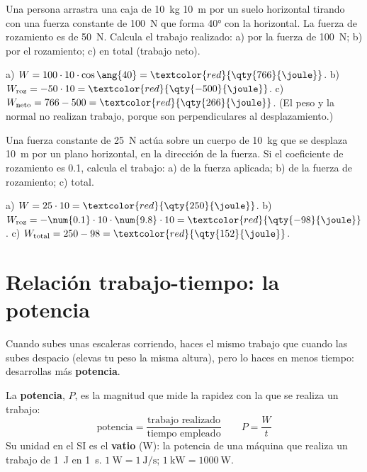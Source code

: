 \begin{exercise}
    Una persona arrastra una caja de \qty{10}{\kg} \qty{10}{\m} por un suelo horizontal tirando con una fuerza constante de \qty{100}{\newton} que forma \ang{40} con la horizontal. La fuerza de rozamiento es de \qty{50}{\newton}. Calcula el trabajo realizado: a) por la fuerza de \qty{100}{\newton}; b) por el rozamiento; c) en total (trabajo neto).
    \begin{solu}
        a) \(W = 100 \cdot 10 \cdot \cos\ang{40} = \textcolor{red}{\qty{766}{\joule}}\). b) \(W_{\text{roz}} = -50 \cdot 10 = \textcolor{red}{\qty{-500}{\joule}}\). c) \(W_{\text{neto}} = 766 - 500 = \textcolor{red}{\qty{266}{\joule}}\). (El peso y la normal no realizan trabajo, porque son perpendiculares al desplazamiento.)
    \end{solu}
\end{exercise}

\begin{exercise}
    Una fuerza constante de \qty{25}{\newton} actúa sobre un cuerpo de \qty{10}{\kg} que se desplaza \qty{10}{\m} por un plano horizontal, en la dirección de la fuerza. Si el coeficiente de rozamiento es \num{0.1}, calcula el trabajo: a) de la fuerza aplicada; b) de la fuerza de rozamiento; c) total.
    \begin{solu}
        a) \(W = 25 \cdot 10 = \textcolor{red}{\qty{250}{\joule}}\). b) \(W_{\text{roz}} = -\num{0.1} \cdot 10 \cdot \num{9.8} \cdot 10 = \textcolor{red}{\qty{-98}{\joule}}\). c) \(W_{\text{total}} = 250 - 98 = \textcolor{red}{\qty{152}{\joule}}\).
    \end{solu}
\end{exercise}

\section[La potencia]{Relación trabajo-tiempo: la potencia}

Cuando subes unas escaleras corriendo, haces el mismo trabajo que cuando las subes despacio (elevas tu peso la misma altura), pero lo haces en menos tiempo: desarrollas más \textbf{potencia}.

\begin{definition}[Potencia]
    La \textbf{potencia}, \(P\), es la magnitud que mide la rapidez con la que se realiza un trabajo:
    \[ \text{potencia} = \frac{\text{trabajo realizado}}{\text{tiempo empleado}} \qquad P = \frac{W}{t} \]
    Su unidad en el SI es el \textbf{vatio} (\unit{\watt}): la potencia de una máquina que realiza un trabajo de \qty{1}{\joule} en \qty{1}{\s}. \(\qty{1}{\watt} = \qty{1}{\joule\per\s}\); \(\qty{1}{\kilo\watt} = \qty{1000}{\watt}\).
\end{definition}

